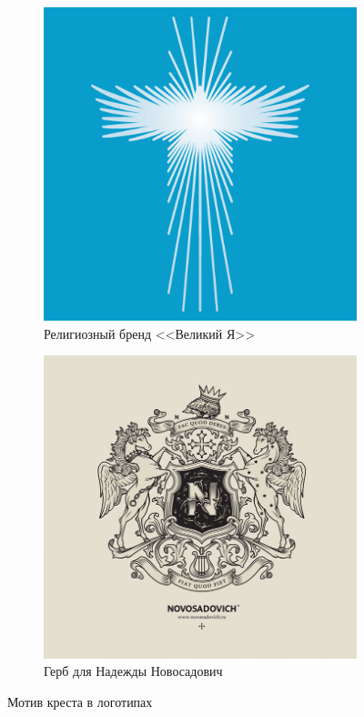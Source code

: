 \begin{figure}[h!]
  \centering
  \begin{subfigure}{.40\textwidth}
    \centering
    \includegraphics[width=\linewidth]{images/cross1}
    \caption{Религиозный бренд <<Великий Я>>}

    \label{fig:cross1}
  \end{subfigure}
  \hfill
  \centering
  \begin{subfigure}{.40\textwidth}
    \centering
    \includegraphics[width=\linewidth]{images/cross2}
    \caption{Герб для Надежды Новосадович}

    \label{fig:cross2}
  \end{subfigure}
  \caption{Мотив креста в логотипах}
\end{figure}

